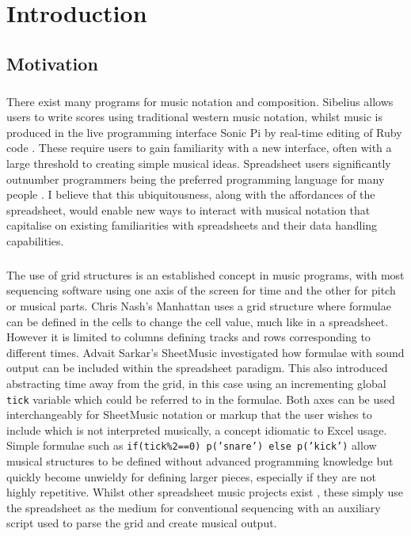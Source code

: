 \chapter{Introduction}

\section{Motivation}

\paragraph{} There exist many programs for music notation and composition. Sibelius allows users to write scores using traditional western music notation, whilst music is produced in the live programming interface Sonic Pi by real-time editing of Ruby code \cite{aaron:pi}. These require users to gain familiarity with a new interface, often with a large threshold to creating simple musical ideas. Spreadsheet users significantly outnumber programmers \cite{scaffidi:estimating} being the preferred programming language for many people \cite{blackwell:functions}. I believe that this ubiquitousness, along with the affordances of the spreadsheet, would enable new ways to interact with musical notation that capitalise on existing familiarities with spreadsheets and their data handling capabilities.

\paragraph{} The use of grid structures is an established concept in music programs, with most sequencing software using one axis of the screen for time and the other for pitch or musical parts. Chris Nash's Manhattan \cite{nash:manhattan} uses a grid structure where formulae can be defined in the cells to change the cell value, much like in a spreadsheet. However it is limited to columns defining tracks and rows corresponding to different times. Advait Sarkar's SheetMusic \cite{sarkar:sheetmusic} investigated how formulae with sound output can be included within the spreadsheet paradigm. This also introduced abstracting time away from the grid, in this case using an incrementing global \texttt{tick} variable which could be referred to in the formulae. Both axes can be used interchangeably for SheetMusic notation or markup that the user wishes to include which is not interpreted musically, a concept idiomatic to Excel usage. Simple formulae such as \texttt{if(tick\%2==0) p('snare') else p('kick')} allow musical structures to be defined without advanced programming knowledge but quickly become unwieldy for defining larger pieces, especially if they are not highly repetitive. Whilst other spreadsheet music projects exist \cite{hackaday:spreadsheet}, these simply use the spreadsheet as the medium for conventional sequencing with an auxiliary script used to parse the grid and create musical output.

